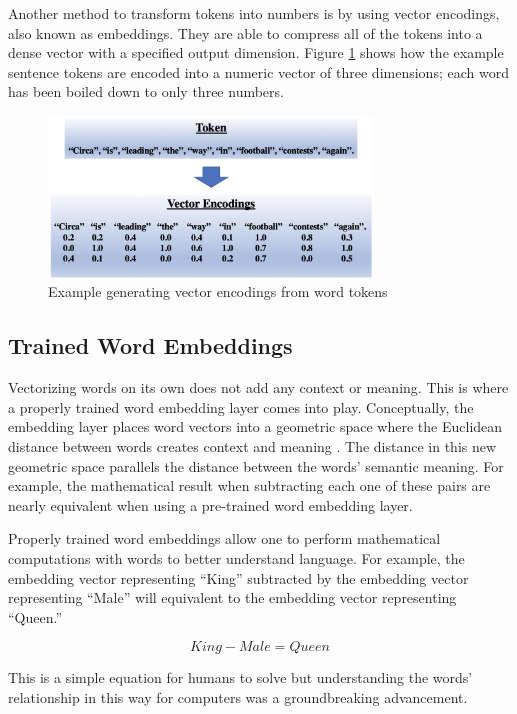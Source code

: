 \documentclass[5p,authoryear]{elsarticle}
\begin{document}
Another method to transform tokens into numbers is by using vector encodings, also known as embeddings. They are able to compress all of the tokens into a dense vector with a specified output dimension. Figure \ref{encoded} shows how the example sentence tokens are encoded into a numeric vector of three dimensions; each word has been boiled down to only three numbers.


\begin{figure}[!h] 
    \centering
	\includegraphics[width=3.4in]{figures/Vector_Encoding.png}
	\caption[]{Example generating vector encodings from word tokens} 
	\label{encoded} 
\end{figure}



\subsection{Trained Word Embeddings}\label{embedding}

Vectorizing words on its own does not add any context or meaning. This is where a properly trained word embedding layer comes into play. Conceptually, the embedding layer places word vectors into a geometric space where the Euclidean distance between words creates context and meaning \citep{chollet}. The distance in this new geometric space parallels the distance between the words’ semantic meaning. For example, the mathematical result when subtracting each one of these pairs are nearly equivalent when using a pre-trained word embedding layer.


Properly trained word embeddings allow one to perform mathematical computations with words to better understand language. For example, the embedding vector representing “King” subtracted by the embedding vector representing “Male” will equivalent to the embedding vector representing “Queen.”

$$King-Male=Queen$$

This is a simple equation for humans to solve but understanding the words’ relationship in this way for computers was a groundbreaking advancement. 
\end{document}
